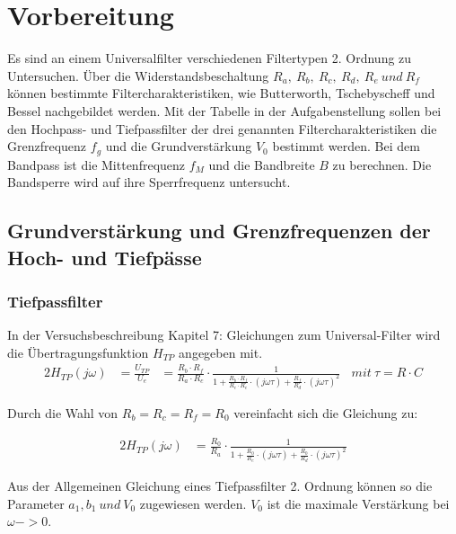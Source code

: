 \section{Vorbereitung}
Es sind an einem Universalfilter verschiedenen Filtertypen 2. Ordnung zu Untersuchen. Über die Widerstandsbeschaltung $R_{a},~R_{b},~R_{c},~R_{d},~R_{e}~und~R_{f}$ können bestimmte Filtercharakteristiken, wie Butterworth, Tschebyscheff und Bessel nachgebildet werden.
Mit der Tabelle in der Aufgabenstellung sollen bei den Hochpass- und Tiefpassfilter der drei genannten Filtercharakteristiken die Grenzfrequenz $f_{g}$ und die Grundverstärkung $V_{0}$ bestimmt werden.
Bei dem Bandpass ist die Mittenfrequenz $f_{M}$ und die Bandbreite $B$ zu berechnen.
Die Bandsperre wird auf ihre Sperrfrequenz untersucht.



\subsection{Grundverstärkung und Grenzfrequenzen der Hoch- und Tiefpässe}

\subsubsection{Tiefpassfilter}

In der Versuchsbeschreibung Kapitel 7: Gleichungen zum Universal-Filter wird die Übertragungsfunktion $H_{TP}$ angegeben mit.\\

\begin{alignat}{2}
H_{TP} (j \omega)&= \frac{U_{TP}}{U_{e}} &= \frac{R_{b} \cdot R_{f}}{R_{a} \cdot R_{c}} \cdot \frac{1}{1+\frac{R_{b} \cdot R_{f}}{R_{c} \cdot R_{e}} \cdot  \left(j \omega \tau \right) + \frac{R_{f}}{R_{d}} \cdot \left ( j \omega \tau \right)^2}~~~~ mit ~\tau = R \cdot C
\end{alignat}

\noindent Durch die Wahl von $R_{b} = R_{c} = R_{f} = R_{0}$ vereinfacht sich die Gleichung zu:

\begin{alignat}{2}
H_{TP} (j \omega) &= \frac{R_{0}}{R_{a}} \cdot \frac{1}{1+\frac{R_{0}}{R_{e}} \cdot  \left(j \omega \tau \right) + \frac{R_{0}}{R_{d}} \cdot \left ( j \omega \tau \right)^2}
\end{alignat}

\noindent Aus der Allgemeinen Gleichung eines Tiefpassfilter 2. Ordnung können so die Parameter $a_{1}, b_{1}~und~V_{0}$ zugewiesen werden. $V_{0}$ ist die maximale Verstärkung bei $\omega -> 0$.

